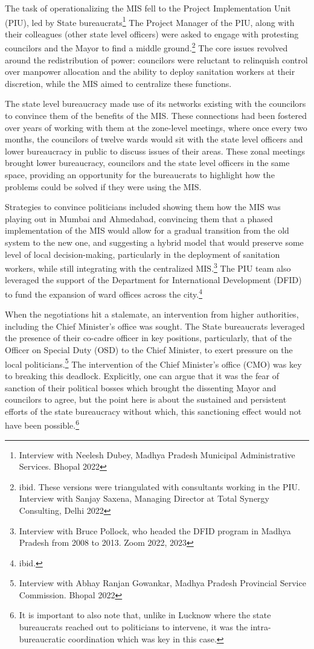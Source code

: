 The task of operationalizing the MIS fell to the Project Implementation Unit (PIU), led by State bureaucrats\footnote{Interview with Neelesh Dubey, Madhya Pradesh Municipal Administrative Services. Bhopal 2022} The Project Manager of the PIU, along with their colleagues (other state level officers) were asked to engage with protesting councilors and the Mayor to find a middle ground.\footnote{ibid. These versions were triangulated with consultants working in the PIU. Interview with Sanjay Saxena, Managing Director at Total Synergy Consulting, Delhi 2022} The core issues revolved around the redistribution of power: councilors were reluctant to relinquish control over manpower allocation and the ability to deploy sanitation workers at their discretion, while the MIS aimed to centralize these functions.

The state level bureaucracy made use of its networks existing with the councilors to convince them of the benefits of the MIS. These connections had been fostered over years of working with them at the zone-level meetings, where once every two months, the councilors of twelve wards would sit with the state level officers and lower bureaucracy in public to discuss issues of their areas. These zonal meetings brought lower bureaucracy, councilors and the state level officers in the same space, providing an opportunity for the bureaucrats to highlight how the problems could be solved if they were using the MIS.

Strategies to convince politicians included showing them how the MIS was playing out in Mumbai and Ahmedabad, convincing them that a phased implementation of the MIS would allow for a gradual transition from the old system to the new one, and suggesting a hybrid model that would preserve some level of local decision-making, particularly in the deployment of sanitation workers, while still integrating with the centralized MIS.\footnote{Interview with Bruce Pollock, who headed the DFID program in Madhya Pradesh from 2008 to 2013. Zoom 2022, 2023} The PIU team also leveraged the support of the Department for International Development (DFID) to fund the expansion of ward offices across the city.\footnote{ibid.}

When the negotiations hit a stalemate, an intervention from higher authorities, including the Chief Minister's office was sought. The State bureaucrats leveraged the presence of their co-cadre officer in key positions, particularly, that of the Officer on Special Duty (OSD) to the Chief Minister, to exert pressure on the local politicians.\footnote{Interview with Abhay Ranjan Gowankar, Madhya Pradesh Provincial Service Commission. Bhopal 2022} The intervention of the Chief Minister's office (CMO) was key to breaking this deadlock. Explicitly, one can argue that it was the fear of sanction of their political bosses which brought the dissenting Mayor and councilors to agree, but the point here is about the sustained and persistent efforts of the state bureaucracy without which, this sanctioning effect would not have been possible.\footnote{It is important to also note that, unlike in Lucknow where the state bureaucrats reached out to politicians to intervene, it was the intra-bureaucratic coordination which was key in this case.}

